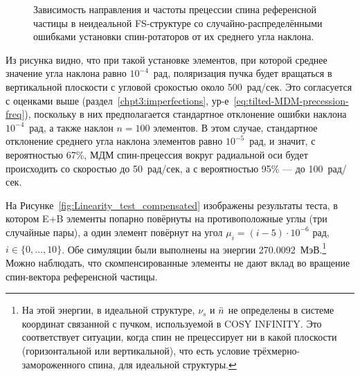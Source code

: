 \begin{figure}[H]\centering
	\caption{Зависимость направления и частоты прецессии спина референсной частицы в неидеальной FS-структуре со случайно-распределёнными ошибками установки спин-ротаторов от их среднего угла наклона.\label{fig:Linearity_test_shifting_gauss}}
\end{figure}

Из рисунка видно, что при такой установке элементов, при которой среднее значение угла наклона равно 
$10^{-4}$~рад, поляризация пучка будет вращаться в вертикальной плоскости с угловой срокостью 
около 500~рад/сек. Это согласуется с оценками выше (раздел~\ref{chpt3:imperfections},
 ур-е~\eqref{eq:tilted-MDM-precession-freq}), поскольку в них предполагается 
 стандартное отклонение ошибки наклона $10^{-4}$~рад, а также наклон ${n=100}$ элементов. 
 В этом случае, стандартное отклонение среднего угла наклона элементов равно $10^{-5}$~рад, и значит, 
 с вероятностью 67\%, МДМ спин-прецессия вокруг радиальной оси будет происходить со скоростью 
 до 50~рад/сек, а с вероятностью 95\% --- до 100~рад/сек.

На Рисунке~\ref{fig:Linearity_test_compensated} изображены результаты теста, в котором 
E+B элементы попарно повёрнуты на противоположные углы (три случайные пары), а один элемент 
повёрнут на угол ${\mu_i = (i-5)\cdot 10^{-6}}$ рад, ${i\in\lbrace0,\dots,10\rbrace}$. Обе симуляции были 
выполнены на энергии 270.0092~МэВ.\footnote{На этой энергии, в идеальной структуре, 
	$\nu_s$ и $\bar n$ не определены в системе координат связанной с пучком, используемой в
	COSY INFINITY. Это соответствует ситуации, когда спин не прецессирует ни в какой плоскости 
	(горизонтальной или вертикальной), что есть условие трёхмерно-замороженного спина, 
	для идеальной структуры.} Можно наблюдать, что скомпенсированные элементы не дают вклад во вращение
спин-вектора референсной частицы.

